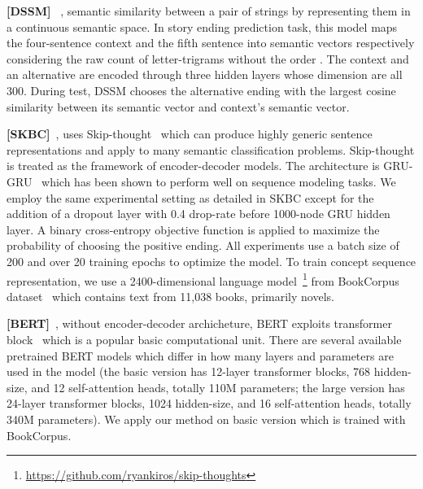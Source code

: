 \textbf{[DSSM]}~\cite{mostafazadeh2016corpus} , semantic similarity 
between a pair of strings by representing them in a continuous semantic space.
In story ending prediction task, this model maps the four-sentence context and 
the fifth sentence into semantic vectors respectively considering the raw count of letter-trigrams without the order .
The context and an alternative are encoded through three hidden layers whose dimension are all 300. 
During test, DSSM chooses the alternative 
ending with the largest cosine similarity between its semantic vector and context's semantic vector.

\textbf{[SKBC]}~\cite{roemmele2017rnn}, uses Skip-thought~\cite{kiros2015skip} which 
can produce highly generic sentence representations and apply to many semantic classification problems.
Skip-thought is treated as the framework of encoder-decoder models. 
The architecture is GRU-GRU~\cite{hochreiter1997long} which 
has been shown to perform well on sequence modeling tasks.  
We employ the same experimental 
setting as detailed in SKBC 
except for the addition of a dropout layer with 0.4 drop-rate before 1000-node GRU hidden layer. 
A binary cross-entropy objective function is applied 
to maximize the probability of choosing the positive ending. 
All experiments use a batch size of 
200 and over 20 training epochs to optimize the model. 
To train concept sequence representation,  
we use a 2400-dimensional language model~\cite{kiros2015skip}\footnote{\url{https://github.com/ryankiros/skip-thoughts}} 
from BookCorpus dataset~\cite{zhu2015aligning} which contains text from
11,038 books, primarily novels.


\textbf{[BERT]}~\cite{devlin2018bert}, without encoder-decoder archicheture, BERT exploits
transformer block~\cite{vaswani2017attention} which is a popular basic computational unit. 
There are several available pretrained BERT models which differ in how many
layers and parameters are used in the model (the basic version has 12-layer transformer blocks, 768 hidden-size, and 12
self-attention heads, totally 110M parameters; the large version has 24-layer transformer blocks, 1024 hidden-size, and
16 self-attention heads, totally 340M parameters). We apply our method on basic version which is trained with BookCorpus.

